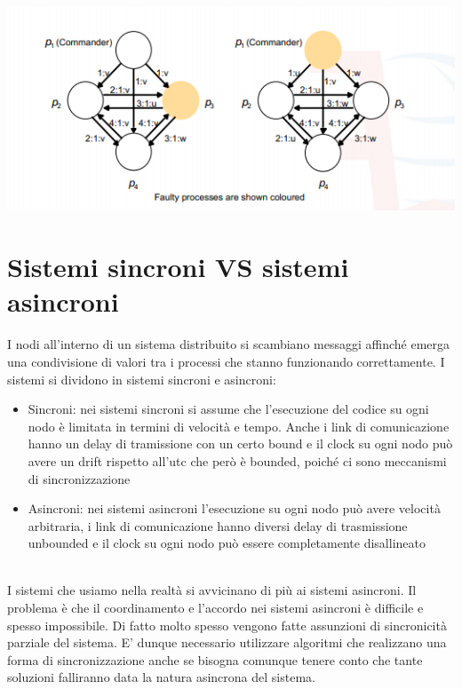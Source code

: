 \begin{center}
    \includegraphics[width = 1\textwidth]{images/lezione5/bizantini.png}
\end{center}

\section{Sistemi sincroni VS sistemi asincroni}
I nodi all'interno di un sistema distribuito si scambiano messaggi affinché emerga una condivisione di valori tra i processi che stanno funzionando correttamente. I sistemi si dividono in sistemi sincroni e asincroni:

\begin{itemize}
    \item Sincroni: nei sistemi sincroni si assume che l'esecuzione del codice su ogni nodo è limitata in termini di velocità e tempo. Anche i link di comunicazione hanno un delay di tramissione con un certo bound e il clock su ogni nodo può avere un drift rispetto all'utc che però è bounded, poiché ci sono meccanismi di sincronizzazione
    \item Asincroni: nei sistemi asincroni l'esecuzione su ogni nodo può avere velocità arbitraria, i link di comunicazione hanno diversi delay di trasmissione unbounded e il clock su ogni nodo può essere completamente disallineato
\end{itemize}

\phantom \\

I sistemi che usiamo nella realtà si avvicinano di più ai sistemi asincroni. Il problema è che il coordinamento e l'accordo nei sistemi asincroni è difficile e spesso impossibile. Di fatto molto spesso vengono fatte assunzioni di sincronicità parziale del sistema. E' dunque necessario utilizzare algoritmi che realizzano una forma di sincronizzazione anche se bisogna comunque tenere conto che tante soluzioni falliranno data la natura asincrona del sistema.

